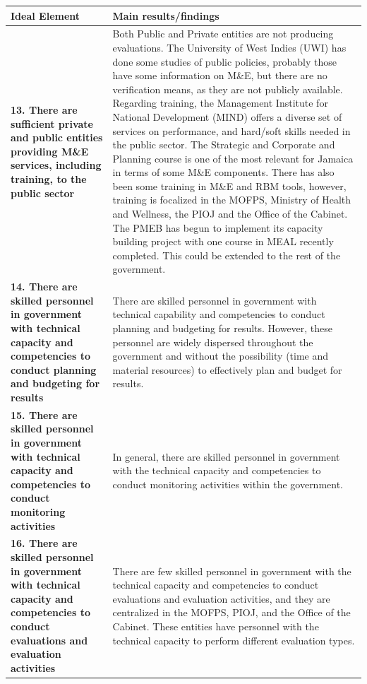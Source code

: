 \documentclass[
  10pt,
]{book}
\begin{document}
\begin{tabu} to 
\hline
Ideal Element & Main results/findings\\
\hline
\textbf{13. There are sufficient private and public entities providing M\&E services, including training, to the public sector} & Both Public and Private entities are not producing evaluations. The University of West Indies (UWI) has done some studies of public policies, probably those have some information on M\&E, but there are no verification means, as they are not publicly available. Regarding training, the Management Institute for National Development (MIND) offers a diverse set of services on performance, and hard/soft skills needed in the public sector. The Strategic and Corporate and Planning course is one of the most relevant for Jamaica in terms of some M\&E components. There has also been some training in M\&E and RBM tools, however, training is focalized in the MOFPS, Ministry of Health and Wellness, the PIOJ and the Office of the Cabinet. The PMEB has begun to implement its capacity building project with one course in MEAL recently completed. This could be extended to the rest of the government.\\
\hline
\textbf{14. There are skilled personnel in government with technical capacity and competencies to conduct planning and budgeting for results} & There are skilled personnel in government with technical capability and competencies to conduct planning and budgeting for results. However, these personnel are widely dispersed throughout the government and without the possibility (time and material resources) to effectively plan and budget for results.\\
\hline
\textbf{15. There are skilled personnel in government with technical capacity and competencies to conduct monitoring activities} & In general, there are skilled personnel in government with the technical capacity and competencies to conduct monitoring activities within the government.\\
\hline
\textbf{16. There are skilled personnel in government with technical capacity and competencies to conduct evaluations and evaluation activities} & There are few skilled personnel in government with the technical capacity and competencies to conduct evaluations and evaluation activities, and they are centralized in the MOFPS, PIOJ, and the Office of the Cabinet. These entities have personnel with the technical capacity to perform different evaluation types.\\
\hline
\end{tabu}
\endgroup{}
\end{document}
